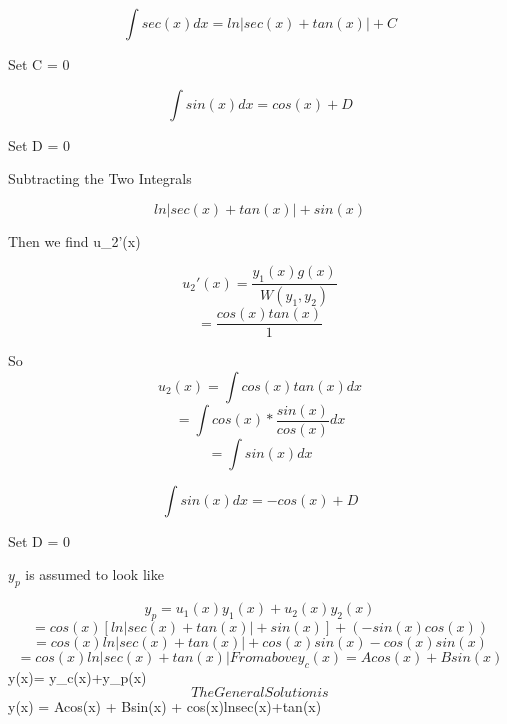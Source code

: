 \documentclass{article}
\begin{document}
$$\int sec(x)dx= ln\lvert sec(x)+tan(x) \rvert + C$$

Set C = 0

$$\int sin(x)dx = cos(x) + D$$

Set D = 0

Subtracting the Two Integrals 

$$ln\lvert sec(x)+tan(x) \rvert + sin(x)$$

Then we find u_{2}'(x)


$$u_{2}'(x)=\frac{y_{1}(x) g(x)}{W(y_{1},y_{2})}$$
$$=\frac{cos(x)tan(x)}{1}$$

So
$$u_{2}(x)=\int cos(x)tan(x) dx$$
$$=\int cos(x)*\frac{sin(x)}{cos(x)}dx$$
$$=\int sin(x)dx$$

$$\int sin(x) dx = -cos(x) + D$$

Set D = 0

    $y_{p}$ is assumed to look like

 $$y_{p}=u_{1}(x)y_{1}(x)+u_{2}(x)y_{2}(x)$$
 $$= cos(x)[ln\lvert sec(x)+tan(x)\rvert + sin(x)]+(-sin(x)cos(x))$$
 $$= cos(x)ln\lvert sec(x)+tan(x) \rvert+cos(x)sin(x)-cos(x)sin(x)$$
 $$= cos(x)ln\lvert sec(x)+tan(x) \rvert 
 
 
 From above y_{c}(x)= Acos(x) + Bsin(x)
 
$$ y(x)= y_{c}(x)+y_{p}(x)$$

The General Solution is


$$y(x) = Acos(x) + Bsin(x) + cos(x)ln\lvert sec(x)+tan(x) \rvert$$
\end{document}
